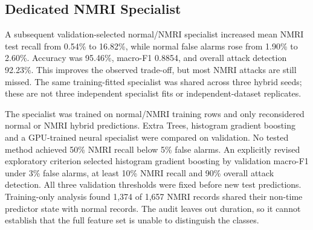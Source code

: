 \subsection{Dedicated NMRI Specialist}
A subsequent validation-selected normal/NMRI specialist increased mean NMRI test recall from 0.54\% to 16.82\%, while normal false alarms rose from 1.90\% to 2.60\%. Accuracy was 95.46\%, macro-F1 0.8854, and overall attack detection 92.23\%. This improves the observed trade-off, but most NMRI attacks are still missed. The same training-fitted specialist was shared across three hybrid seeds; these are not three independent specialist fits or independent-dataset replicates.

The specialist was trained on normal/NMRI training rows and only reconsidered normal or NMRI hybrid predictions. Extra Trees, histogram gradient boosting and a GPU-trained neural specialist were compared on validation. No tested method achieved 50\% NMRI recall below 5\% false alarms. An explicitly revised exploratory criterion selected histogram gradient boosting by validation macro-F1 under 3\% false alarms, at least 10\% NMRI recall and 90\% overall attack detection. All three validation thresholds were fixed before new test predictions. Training-only analysis found 1,374 of 1,657 NMRI records shared their non-time predictor state with normal records. The audit leaves out duration, so it cannot establish that the full feature set is unable to distinguish the classes.

\begin{table}[htbp]\centering\small\setlength{\tabcolsep}{3pt}

\caption{Observed test operating points. NMRI denotes class recall, and FPR is the normal false-positive rate. Means use three hybrid seeds; the specialist is shared.}
\end{table}
